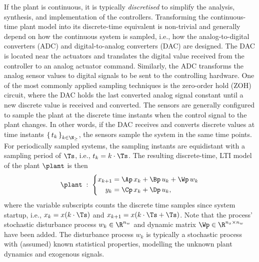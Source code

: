 If the plant is continuous, it is typically \emph{discretised} to simplify the analysis, synthesis, and implementation of the controllers.
Transforming the continuous-time plant model into its discrete-time equivalent is non-trivial and generally depend on how the continuous system is sampled, i.e., how the analog-to-digital converters (ADC) and digital-to-analog converters (DAC) are designed.
The DAC is located near the actuators and translates the digital value received from the controller to an analog actuator command.
Similarly, the ADC transforms the analog sensor values to digital signals to be sent to the controlling hardware.
One of the most commonly applied sampling techniques is the zero-order hold (ZOH) circuit, where the DAC holds the last converted analog signal constant until a new discrete value is received and converted.
The sensors are generally configured to sample the plant at the discrete time instants when the control signal to the plant changes.
In other words, if the DAC receives and converts discrete values at time instants $\left\{\, t_k \,\right\}_{k\in\N_{\geq}}$, the sensors sample the system in the same time points.
For periodically sampled systems, the sampling instants are equidistant with a sampling period of $\Ts$, i.e., $t_k = k\cdot \Ts$.
The resulting discrete-time, LTI model of the plant $\plant$ is then
%
\begin{equation}%
    \label{eq:discrete-lti-plant}%
    \plant \; : \; \left\{\begin{aligned}
        x_{k+1} &= \Ap\,x_k + \Bp\,u_k + \Wp\, w_k\\
        y_k &= \Cp\,x_k + \Dp\,u_k, \\
    \end{aligned}\right.
\end{equation}
%
where the variable subscripts counts the discrete time samples since system startup, i.e., $x_k = x(k\cdot \Ts)$ and $x_{k+1} = x(k\cdot \Ts + \Ts)$.
Note that the process' stochastic disturbance process $w_k \in \R^{n_w}$ and dynamic matrix $\Wp \in \R^{n_x \times n_w}$ have been added.
The disturbance process $w_k$ is typically a stochastic process with (assumed) known statistical properties, modelling the unknown plant dynamics and exogenous signals.
 

